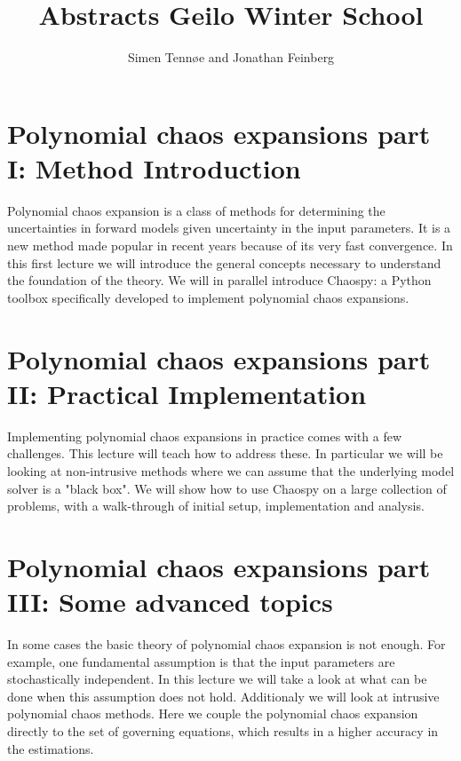 \documentclass[a4paper,10pt]{article}
\title{Abstracts Geilo Winter School}
\author{Simen Tennøe and Jonathan Feinberg}
\begin{document}
\maketitle
\newpage


\section{Polynomial chaos expansions part I: Method Introduction}

Polynomial chaos expansion is a class of methods for determining the
uncertainties in forward models given uncertainty in the input parameters.
It is a new method made popular in recent years because of
its very fast convergence.
In this first lecture we will introduce the
general concepts necessary to understand the foundation of the theory.
We will in parallel introduce Chaospy: a Python
toolbox specifically developed to implement polynomial chaos
expansions.

\section{Polynomial chaos expansions part II: Practical Implementation}

Implementing polynomial chaos expansions in practice comes with a
few challenges. This lecture will teach how to address these.
In particular we will be looking at non-intrusive methods where we
can assume that the underlying model solver is a "black box".
We will show how to use Chaospy on a large collection of problems,
with a walk-through of initial setup, implementation and analysis.

\section{Polynomial chaos expansions part III: Some advanced topics}

In some cases the basic theory of polynomial chaos expansion is not
enough.
For example, one fundamental assumption is that the
input parameters are stochastically independent.
In this lecture we will take a look at what
can be done when this assumption does not hold.
Additionaly we will look at intrusive polynomial chaos
methods.
Here we couple the polynomial chaos expansion directly to
the set of governing equations, which results in a higher accuracy in
the estimations.
\end{document}
